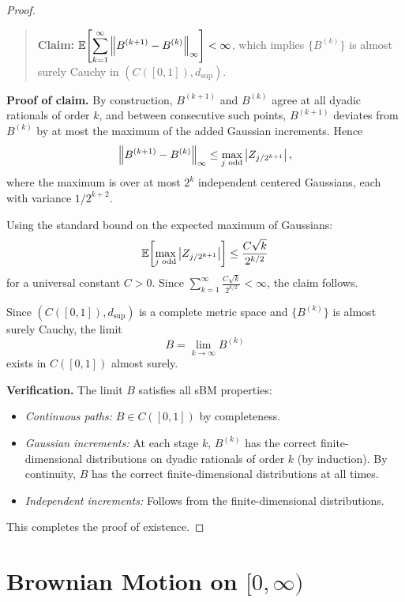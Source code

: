 \begin{proof}
    \begin{quote}
    \textbf{Claim:} $\displaystyle \mathbb{E}\!\left[\sum_{k=1}^{\infty} \left\|B^{(k+1)} - B^{(k)}\right\|_\infty\right] < \infty$, which implies $\{B^{(k)}\}$ is almost surely Cauchy in $(C([0,1]), d_{\sup})$.
    \end{quote}

    \textbf{Proof of claim.} By construction, $B^{(k+1)}$ and $B^{(k)}$ agree at all dyadic rationals of order $k$, and between consecutive such points, $B^{(k+1)}$ deviates from $B^{(k)}$ by at most the maximum of the added Gaussian increments. Hence
    \[
        \left\|B^{(k+1)} - B^{(k)}\right\|_\infty \leq \max_{j \text{ odd}} \left|Z_{j/2^{k+1}}\right|,
    \]
    where the maximum is over at most $2^k$ independent centered Gaussians, each with variance $1/2^{k+2}$.

    Using the standard bound on the expected maximum of Gaussians:
    \[
        \mathbb{E}\!\left[\max_{j \text{ odd}} \left|Z_{j/2^{k+1}}\right|\right] \leq \frac{C\sqrt{k}}{2^{k/2}}
    \]
    for a universal constant $C > 0$. Since $\sum_{k=1}^{\infty} \frac{C\sqrt{k}}{2^{k/2}} < \infty$, the claim follows.

    \medskip
    Since $(C([0,1]), d_{\sup})$ is a complete metric space and $\{B^{(k)}\}$ is almost surely Cauchy, the limit
    \[
        B = \lim_{k \to \infty} B^{(k)}
    \]
    exists in $C([0,1])$ almost surely.

    \medskip
    \textbf{Verification.} The limit $B$ satisfies all sBM properties:
    \begin{itemize}
        \item \emph{Continuous paths:} $B \in C([0,1])$ by completeness.
        \item \emph{Gaussian increments:} At each stage $k$, $B^{(k)}$ has the correct finite-dimensional distributions on dyadic rationals of order $k$ (by induction). By continuity, $B$ has the correct finite-dimensional distributions at all times.
        \item \emph{Independent increments:} Follows from the finite-dimensional distributions.
    \end{itemize}
    This completes the proof of existence. \qedhere
\end{proof}

\section{Brownian Motion on $[0,\infty)$}

